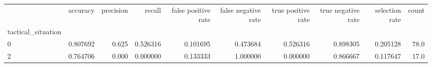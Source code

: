 \begin{tabular}{lrrrrrrrrr}
\toprule
{} &  accuracy &  precision &    recall &  false positive rate &  false negative rate &  true positive rate &  true negative rate &  selection rate &  count \\
tactical\_situation &           &            &           &                      &                      &                     &                     &                 &        \\
\midrule
0                  &  0.807692 &      0.625 &  0.526316 &             0.101695 &             0.473684 &            0.526316 &            0.898305 &        0.205128 &   78.0 \\
2                  &  0.764706 &      0.000 &  0.000000 &             0.133333 &             1.000000 &            0.000000 &            0.866667 &        0.117647 &   17.0 \\
\bottomrule
\end{tabular}

